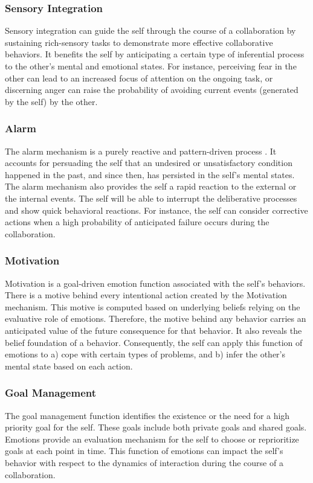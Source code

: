 \documentclass[12pt]{report}
\begin{document}
\subsubsection{Sensory Integration} Sensory integration can guide the self
through the course of a collaboration by sustaining rich-sensory tasks to
demonstrate more effective collaborative behaviors. It benefits the self by
anticipating a certain type of inferential process to the other's mental and
emotional states. For instance, perceiving fear in the other can lead to an
increased focus of attention on the ongoing task, or discerning anger can raise
the probability of avoiding current events (generated by the self) by the other.

\subsubsection{Alarm} \label{sub:emotion-alarm} The alarm mechanism is a
purely reactive and pattern-driven process \cite{sloman:beyond-shallow}. It
accounts for persuading the self that an undesired or unsatisfactory condition
happened in the past, and since then, has persisted in the self's mental
states. The alarm mechanism also provides the self a rapid reaction to the
external or the internal events. The self will be able to interrupt the
deliberative processes and show quick behavioral reactions. For instance, the
self can consider corrective actions when a high probability of anticipated
failure occurs during the collaboration.

\subsubsection{Motivation} Motivation is a goal-driven emotion function
associated with the self's behaviors. There is a motive behind every intentional action
created by the Motivation mechanism. This motive is computed based on underlying
beliefs relying on the evaluative role of emotions. Therefore, the motive behind
any behavior carries an anticipated value of the future consequence for that
behavior. It also reveals the belief foundation of a behavior. Consequently, the
self can apply this function of emotions to a) cope with certain types of
problems, and b) infer the other's mental state based on each action.

\subsubsection{Goal Management} The goal management function identifies the
existence or the need for a high priority goal for the self. These goals
include both private goals and shared goals. Emotions provide an evaluation
mechanism for the self to choose or reprioritize goals at each point in time.
This function of emotions can impact the self's behavior with respect to the
dynamics of interaction during the course of a collaboration.
\end{document}
